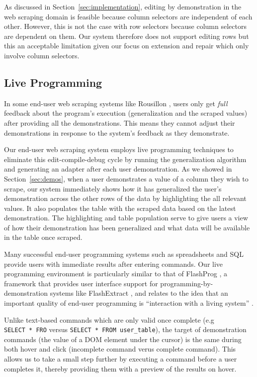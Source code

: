 \documentclass[sigconf,10pt]{acmart}
\begin{document}
As discussed in Section~\ref{sec:implementation}, editing by
demonstration in the web scraping domain is feasible because column
selectors are independent of each other. However, this is not the case
with row selectors because column selectors are dependent on them. Our
system therefore does not support editing rows but this an acceptable
limitation given our focus on extension and repair which only involve
column selectors.

\hypertarget{live-programming-1}{%
\subsection{Live Programming}\label{live-programming-1}}

In some end-user web scraping systems like Rousillon
\citep{chasins2018}, users only get \emph{full} feedback about the
program's execution (generalization and the scraped values) after
providing all the demonstrations. This means they cannot adjust their
demonstrations in response to the system's feedback as they demonstrate.

Our end-user web scraping system employs live programming techniques to
eliminate this edit-compile-debug cycle by running the generalization
algorithm and generating an adapter after each user demonstration. As we
showed in Section~\ref{sec:demos}, when a user demonstrates a value of a
column they wish to scrape, our system immediately shows how it has
generalized the user's demonstration across the other rows of the data
by highlighting the all relevant values. It also populates the table
with the scraped data based on the latest demonstration. The
highlighting and table population serve to give users a view of how
their demonstration has been generalized and what data will be available
in the table once scraped.

Many successful end-user programming systems such as spreadsheets and
SQL provide users with immediate results after entering commands. Our
live programming environment is particularly similar to that of
FlashProg \citep{mayer2015}, a framework that provides user interface
support for programming-by-demonstration systems like FlashExtract
\citep{le2014}, and relates to the idea that an important quality of
end-user programming is ``interaction with a living system''
\citep{zotero-60}.

Unlike text-based commands which are only valid once complete (e.g
\texttt{SELECT\ *\ FRO} versus \texttt{SELECT\ *\ FROM\ user\_table}),
the target of demonstration commands (the value of a DOM element under
the cursor) is the same during both hover and click (incomplete command
verus complete command). This allows us to take a small step further by
executing a command before a user completes it, thereby providing them
with a preview of the results on hover.
\end{document}
